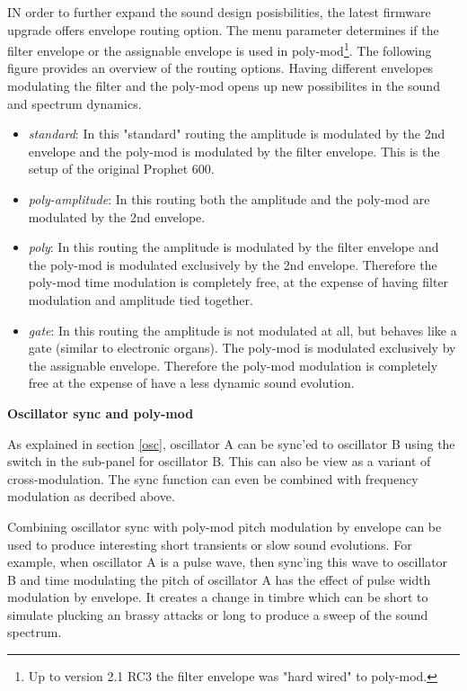 IN order to further expand the sound design posisbilities, the latest firmware upgrade offers envelope routing   option. The menu parameter \envrouting determines if the filter envelope or the assignable envelope is used in poly-mod\footnote{Up to version 2.1 RC3 the filter envelope was "hard wired" to poly-mod.}. The following figure provides an overview of the routing options. Having different envelopes modulating the filter and the poly-mod opens up new possibilites in the sound and spectrum dynamics. 

\begin{itemize}
  \setlength\itemsep{0cm}
  \item \textit{standard}: In this "standard" routing the amplitude is modulated by the 2nd envelope and the poly-mod is modulated by the filter envelope. This is the setup of the original Prophet 600. 
  \item \textit{poly-amplitude}: In this routing both the amplitude and the poly-mod are modulated by the 2nd envelope. 
  \item \textit{poly}: In this routing the amplitude is modulated by the filter envelope and the poly-mod is modulated exclusively by the 2nd envelope. Therefore the poly-mod time modulation is completely free, at the expense of having filter modulation and amplitude tied together.
  \item \textit{gate}: In this routing the amplitude is not modulated at all, but behaves like a gate (similar to electronic organs). The poly-mod is modulated exclusively by the assignable envelope. Therefore the poly-mod modulation is completely free at the expense of have a less dynamic sound evolution.
\end{itemize}  


\textbf{Oscillator sync and poly-mod}

As explained in section \ref{osc}, oscillator A can be sync'ed to oscillator B using the \oscsync switch in the sub-panel for oscillator B. This can also be view as a variant of cross-modulation. The sync function can even be combined with frequency modulation as decribed above. 

Combining oscillator sync with poly-mod pitch modulation by envelope can be used to produce interesting short transients or slow sound evolutions. For example, when oscillator A is a pulse wave, then sync'ing this wave to oscillator B and time modulating the pitch of oscillator A has the effect of pulse width modulation by envelope. It creates a change in timbre which can be short to simulate plucking an brassy attacks or long to produce a sweep of the sound spectrum.


